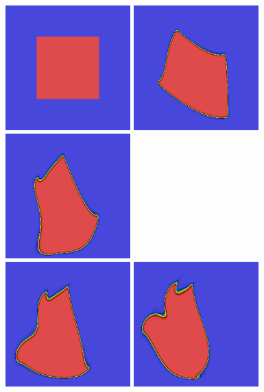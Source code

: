 \documentclass[final]{siamltex}
\begin{document}
\begin{figure}
\begin{center}
\includegraphics[width=1.9in]{square_movie1}
\includegraphics[width=1.9in]{square_movie2}
\includegraphics[width=1.9in]{square_movie3} \\
\includegraphics[width=1.9in]{square_movie4}
\includegraphics[width=1.9in]{square_movie5}

\end{center}
\end{figure}
\end{document}
